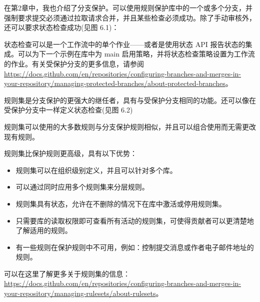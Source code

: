 
在第2章中，我也介绍了分支保护。可以使用规则保护库中的一个或多个分支，并强制要求提交必须通过拉取请求合并，并且某些检查必须成功。除了手动审核外，还可以要求状态检查成功(见图 6.1)：


状态检查可以是一个工作流中的单个作业——或者是使用状态 API 报告状态的集成。可以为下一个示例在库中为 main 启用策略，并将状态检查策略设置为工作流的作业。有关受保护分支的更多信息，请参阅 \url{https://docs.github.com/en/repositories/configuring-branches-and-merges-in-your-repository/managing-protected-branches/about-protected-branches}。


规则集是分支保护的更强大的继任者，具有与受保护分支相同的功能。还可以像在受保护分支中一样定义状态检查(见图 6.2)


规则集可以使用的大多数规则与分支保护规则相似，并且可以组合使用而无需更改现有规则。

规则集比保护规则更高级，具有以下优势：

\begin{itemize}
\item 
规则集可以在组织级别定义，并且可以针对多个库。

\item
可以通过同时应用多个规则集来分层规则。

\item
规则集具有状态，允许在不删除的情况下在库中激活或停用规则集。

\item
只需要库的读取权限即可查看所有活动的规则集，可使得贡献者可以更清楚地了解适用的规则。

\item
有一些规则在保护规则中不可用，例如：控制提交消息或作者电子邮件地址的规则。
\end{itemize}

可以在这里了解更多关于规则集的信息：\url{https://docs.github.com/en/repositories/configuring-branches-and-merges-in-your-repository/managing-rulesets/about-rulesets}。